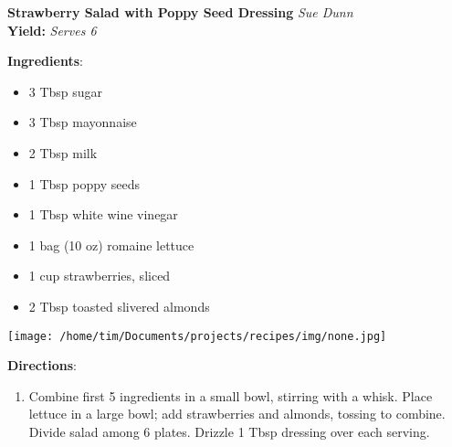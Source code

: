 \documentclass[11pt, twoside, openany]{book}
\begin{document}
\noindent\begin{minipage}[t]{\linewidth}%
{\Large\textbf{Strawberry Salad with Poppy Seed Dressing}} \label{strawberry-salad-with-poppy-seed-dressing}\hfill\textit{Sue Dunn}\\
\textbf{Yield:} \textit{Serves 6}\\
\noindent\begin{minipage}[t]{0.78\linewidth}%
\textbf{Ingredients}:\vspace{-3mm}
\begin{multicols}{2}
\begin{itemize}\setlength\itemsep{-1mm}
\item 3 Tbsp sugar
\item 3 Tbsp mayonnaise
\item 2 Tbsp milk
\item 1 Tbsp poppy seeds
\item 1 Tbsp white wine vinegar
\item 1 bag (10 oz) romaine lettuce
\item 1 cup strawberries, sliced
\item 2 Tbsp toasted slivered almonds
\end{itemize}
\end{multicols}
\end{minipage}
\noindent\begin{minipage}[t]{0.18\linewidth}
\centering \strut\vspace*{-\baselineskip}\newline
\texttt{[image: /home/tim/Documents/projects/recipes/img/none.jpg]}\\
\end{minipage}\vspace{3mm}
\textbf{Directions}:
\vspace{-3mm}\begin{enumerate}\setlength\itemsep{-1mm}
\item Combine first 5 ingredients in a small bowl, stirring with a whisk. Place lettuce in a large bowl; add strawberries and almonds, tossing to combine. Divide salad among 6 plates. Drizzle 1 Tbsp dressing over each serving.
\end{enumerate}
\end{minipage}\vspace{8mm}
\end{document}
